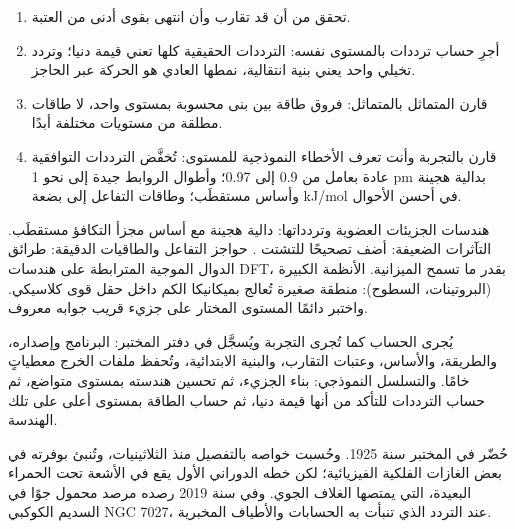 \begin{method}\label{met:b3:computational-chemistry:read-calculation}
\begin{enumerate}
  \item تحقق من أن  قد تقارب وأن  انتهى
        بقوى أدنى من العتبة.
  \item أجرِ حساب ترددات بالمستوى نفسه: الترددات الحقيقية كلها
        تعني قيمة دنيا؛ وتردد تخيلي واحد يعني بنية انتقالية، نمطها
        العادي هو الحركة عبر الحاجز.
  \item قارن المتماثل بالمتماثل: فروق طاقة بين بنى
        محسوبة بمستوى واحد، لا طاقات مطلقة من مستويات مختلفة أبدًا.
  \item قارن بالتجربة وأنت تعرف الأخطاء النموذجية للمستوى:
        تُخفَّض الترددات التوافقية عادة بعامل من 0.9 إلى 0.97؛
        وأطوال الروابط جيدة إلى نحو 1 pm بدالية هجينة وأساس
        مستقطَب؛ وطاقات التفاعل إلى بضعة \unit{kJ/mol} في أحسن الأحوال.
\end{enumerate}
\end{method}

\begin{method}\label{met:b3:computational-chemistry:choose-level}
هندسات الجزيئات العضوية وتردداتها: دالية هجينة مع
أساس مجزأ التكافؤ مستقطَب. التآثرات الضعيفة: أضف تصحيحًا
للتشتت . حواجز التفاعل والطاقيات
الدقيقة: طرائق الدوال الموجية المترابطة على هندسات DFT، بقدر ما تسمح
الميزانية. الأنظمة الكبيرة (البروتينات، السطوح): منطقة صغيرة تُعالج
بميكانيكا الكم داخل حقل قوى كلاسيكي. واختبر دائمًا المستوى
المختار على جزيء قريب جوابه معروف.
\end{method}

\begin{inthelab}
يُجرى الحساب كما تُجرى التجربة ويُسجَّل في دفتر المختبر:
البرنامج وإصداره، والطريقة، والأساس، وعتبات التقارب،
والبنية الابتدائية، وتُحفظ ملفات الخرج معطياتٍ خامًا. والتسلسل
النموذجي: بناء الجزيء، ثم تحسين هندسته بمستوى متواضع، ثم
حساب الترددات للتأكد من أنها قيمة دنيا، ثم حساب الطاقة بمستوى
أعلى على تلك الهندسة.
\end{inthelab}

\begin{history}
حُضّر  في المختبر سنة 1925. وحُسبت خواصه
بالتفصيل منذ الثلاثينيات، وتُنبئ بوفرته في
بعض الغازات الفلكية الفيزيائية؛ لكن خطه الدوراني الأول يقع في الأشعة تحت الحمراء
البعيدة، التي يمتصها الغلاف الجوي. وفي سنة 2019 رصده مرصد محمول جوًا
في السديم الكوكبي NGC 7027، عند التردد الذي تنبأت به الحسابات
والأطياف المخبرية.
\end{history}

